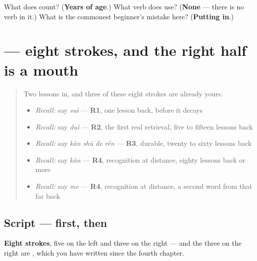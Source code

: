 \begin{tcolorbox}[breakable,colback=teal!4,colframe=teal!35!black,title={Before you move on}]
What does  count? (\textbf{Years of age}.) What verb does  use? (\textbf{None} — there is no verb in it.) What is the commonest beginner's mistake here? (\textbf{Putting  in}.)
\end{tcolorbox}
\section[\texorpdfstring{\zh{和} (hé)}{和 (hé)}]{ — eight strokes, and the right half is a mouth}

\label{lesson:ZH-W27-he}



\begin{quote}
Two lessons in, and three of these eight strokes are already yours.

\begin{itemize}
\raggedright
  \item \emph{Recall:} say \emph{suì} — \textbf{R1}, one lesson back, before it decays
  \item \emph{Recall:} say \emph{duì} — \textbf{R2}, the first real retrieval, five to fifteen lessons back
  \item \emph{Recall:} say \emph{kàn shū de rén} — \textbf{R3}, durable, twenty to sixty lessons back
  \item \emph{Recall:} say \emph{kàn} — \textbf{R4}, recognition at distance, eighty lessons back or more
  \item \emph{Recall:} say \emph{me} — \textbf{R4}, recognition at distance, a second word from that far back
\end{itemize}
\end{quote}

\subsection*{Script —  first, then }

\begin{quote}
\end{quote}

\textbf{Eight strokes}, five on the left and three on the right — and the three on the right are , which you have written since the fourth chapter.

